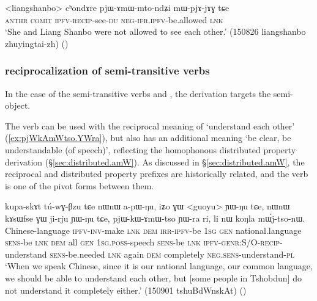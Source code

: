 \begin{exe}
\ex \label{ex:pjAmWmtondZi}
\gll <liangshanbo> cʰondɤre pjɯ-ɤmɯ-mto-ndʑi mɯ-pjɤ-jɤɣ tɕe \\
\textsc{anthr} \textsc{comit} \textsc{ipfv}-\textsc{recip}-see-\textsc{du} \textsc{neg}-\textsc{ifr}.\textsc{ipfv}-be.allowed \textsc{lnk} \\
\glt `She and Liang Shanbo were not allowed to see each other.' (150826 liangshanbo zhuyingtai-zh) ()
\end{exe}


\subsubsection{ reciprocalization of semi-transitive verbs}
In the case of the semi-transitive verbs  and , the  derivation targets the semi-object.

The verb  can be used with the reciprocal meaning of `understand each other' (\ref{ex:pjWkAmWtso.YWra}), but also has an additional meaning `be clear, be understandable (of speech)', reflecting the homophonous  distributed property derivation (§\ref{sec:distributed.amW}). As discussed in §\ref{sec:distributed.amW}, the reciprocal and distributed property  prefixes are historically related, and the verb  is one of the pivot forms between them.

\begin{exe}
\ex \label{ex:pjWkAmWtso.YWra}
 \gll kupa-skɤt tú-wɣ-βzu tɕe nɯnɯ a-pɯ-ŋu, iʑo ɣɯ <guoyu> ɲɯ-ŋu tɕe, nɯnɯ kɤsɯfse ɣɯ ji-rju ɲɯ-ŋu tɕe, pjɯ-kɯ-ɤmɯ-tso ɲɯ-ra ri, li nɯ koŋla mɯ́j-tso-nɯ. \\
 Chinese-language \textsc{ipfv}-\textsc{inv}-make \textsc{lnk} \textsc{dem} \textsc{irr}-\textsc{ipfv}-be \textsc{1sg} \textsc{gen} national.language \textsc{sens}-be \textsc{lnk} \textsc{dem} all \textsc{gen} \textsc{1sg}.\textsc{poss}-speech \textsc{sens}-be \textsc{lnk} \textsc{ipfv}-\textsc{genr}:S/O-\textsc{recip}-understand \textsc{sens}-be.needed \textsc{lnk} again \textsc{dem} completely \textsc{neg}.\textsc{sens}-understand-\textsc{pl} \\
\glt `When we speak Chinese, since it is our national language, our common language, we should be able to understand each other, but [some people in Tshobdun] do not understand it completely either.' (150901 tshuBdWnskAt)
()
\end{exe}

